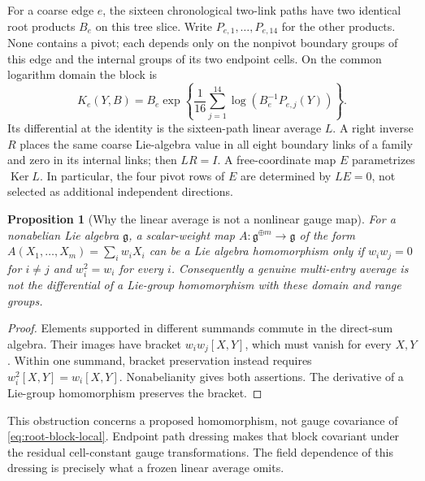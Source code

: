 \documentclass[11pt,oneside,openany]{book}
\newtheorem{proposition}[proposition]{Proposition}
\theoremstyle{definition}
\theoremstyle{remark}
\newcommand{\Ker}{\operatorname{Ker}}
\newcommand{\src}[2]{\cite[#2]{#1}}
\begin{document}
For a coarse edge $e$, the sixteen chronological two-link paths have two
identical root products $B_e$ on this tree slice. Write
$P_{e,1},\ldots,P_{e,14}$ for the other products. None contains a pivot;
each depends only on the nonpivot boundary groups of this edge and the
internal groups of its two endpoint cells. On the common logarithm
domain the block is
\begin{equation}\label{eq:root-block-local}
K_e(Y,B)=B_e\exp\left\{\frac1{16}\sum_{j=1}^{14}
                  \log(B_e^{-1}P_{e,j}(Y))\right\}.
\end{equation}
Its differential at the identity is the sixteen-path linear average
$L$. A right inverse $R$ places the same coarse Lie-algebra value in all
eight boundary links of a family and zero in its internal links; then
$LR=I$. A free-coordinate map $E$ parametrizes $\Ker L$. In particular,
the four pivot rows of $E$ are determined by $LE=0$, not selected as
additional independent directions. \src{F11}{V57--V58, V64--V66, V76}

\begin{proposition}[Why the linear average is not a nonlinear gauge map]
\label{prop:nonabelian-average}
For a nonabelian Lie algebra $\mathfrak g$, a scalar-weight map
$A:\mathfrak g^{\oplus m}\to\mathfrak g$ of the form
$A(X_1,\ldots,X_m)=\sum_i w_iX_i$ can be a Lie algebra homomorphism
only if $w_iw_j=0$ for $i\ne j$ and $w_i^2=w_i$ for every $i$.
Consequently a genuine multi-entry average is not the differential of
a Lie-group homomorphism with these domain and range groups.
\end{proposition}
\begin{proof}
Elements supported in different summands commute in the direct-sum
algebra. Their images have bracket $w_iw_j[X,Y]$, which must vanish
for every $X,Y$. Within one summand, bracket preservation instead
requires $w_i^2[X,Y]=w_i[X,Y]$. Nonabelianity gives both assertions.
The derivative of a Lie-group homomorphism preserves the bracket.
\end{proof}
This obstruction concerns a proposed homomorphism, not gauge covariance
of \cref{eq:root-block-local}. Endpoint path dressing makes that block
covariant under the residual cell-constant gauge transformations. The
field dependence of this dressing is precisely what a frozen linear
average omits. \src{F11}{V56--V57}
\end{document}
